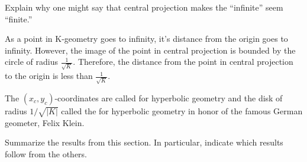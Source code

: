 \documentclass{ximera}
\begin{document}
\begin{problem}
  Explain why one might say that central projection makes the
  ``infinite'' seem ``finite.''
    \begin{freeResponse}
    As a point in K-geometry goes to infinity, it's distance from the origin goes to infinity. However, the image of the point in central projection is bounded by the circle of radius $\frac{1}{\sqrt{K}}$. Therefore, the distance from the point in central projection to the origin is less than $\frac{1}{\sqrt{K}}$.
    \end{freeResponse}
\end{problem}

The $(x_{c},y_{c})$-coordinates are called  for
hyperbolic geometry and the disk of radius $1/\sqrt{|K|}$ called the
 for hyperbolic geometry in honor of the famous
German geometer, Felix Klein.

\begin{problem}
Summarize the results from this section. In particular, indicate which
results follow from the others.
\begin{freeResponse}
\end{freeResponse}
\end{problem}
\end{document}

